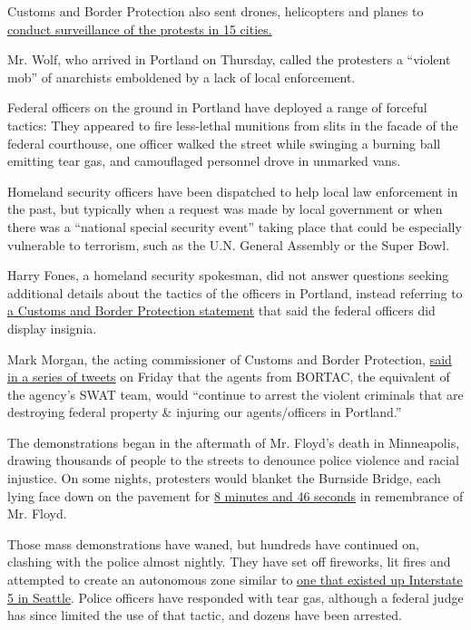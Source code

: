 Customs and Border Protection also sent drones, helicopters and planes
to
\href{https://www.nytimes3xbfgragh.onion/2020/06/19/us/politics/george-floyd-protests-surveillance.html}{conduct
surveillance of the protests in 15 cities.}

Mr. Wolf, who arrived in Portland on Thursday, called the protesters a
``violent mob'' of anarchists emboldened by a lack of local enforcement.

Federal officers on the ground in Portland have deployed a range of
forceful tactics: They appeared to fire less-lethal munitions from slits
in the facade of the federal courthouse, one officer walked the street
while swinging a burning ball emitting tear gas, and camouflaged
personnel drove in unmarked vans.

Homeland security officers have been dispatched to help local law
enforcement in the past, but typically when a request was made by local
government or when there was a ``national special security event''
taking place that could be especially vulnerable to terrorism, such as
the U.N. General Assembly or the Super Bowl.

Harry Fones, a homeland security spokesman, did not answer questions
seeking additional details about the tactics of the officers in
Portland, instead referring to
\href{https://www.cbp.gov/newsroom/speeches-and-statements/statement-cbp-response-portland-oregon}{a
Customs and Border Protection statement} that said the federal officers
did display insignia.

Mark Morgan, the acting commissioner of Customs and Border Protection,
\href{https://twitter.com/CBPMarkMorgan/status/1284206662434402305}{said
in a series of tweets} on Friday that the agents from BORTAC, the
equivalent of the agency's SWAT team, would ``continue to arrest the
violent criminals that are destroying federal property \& injuring our
agents/officers in Portland.''

The demonstrations began in the aftermath of Mr. Floyd's death in
Minneapolis, drawing thousands of people to the streets to denounce
police violence and racial injustice. On some nights, protesters would
blanket the Burnside Bridge, each lying face down on the pavement for
\href{https://www.nytimes3xbfgragh.onion/2020/06/18/us/george-floyd-timing.html}{8
minutes and 46 seconds} in remembrance of Mr. Floyd.

Those mass demonstrations have waned, but hundreds have continued on,
clashing with the police almost nightly. They have set off fireworks,
lit fires and attempted to create an autonomous zone similar to
\href{https://www.nytimes3xbfgragh.onion/2020/07/01/us/seattle-protest-zone-CHOP-CHAZ-unrest.html}{one
that existed up Interstate 5 in Seattle}. Police officers have responded
with tear gas, although a federal judge has since limited the use of
that tactic, and dozens have been arrested.

